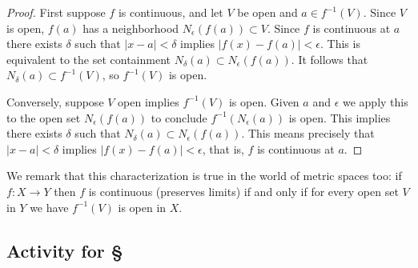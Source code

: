 \documentclass[11pt,oneside]{amsbook}
\theoremstyle{definition}
\theoremstyle{plain}
\theoremstyle{definition}
\theoremstyle{remark}
\numberwithin{equation}{section}
\numberwithin{figure}{section}
\begin{document}
\begin{proof}
  First suppose $f$ is continuous, and let $V$ be open and $a\in f^{-1}(V)$. Since $V$ is open, $f(a)$ has a neighborhood $N_\epsilon(f(a))\subset V$. Since $f$ is continuous at $a$ there exists $\delta$ such that $|x-a|<\delta$ implies $|f(x)-f(a)|<\epsilon$. This is equivalent to the set containment $N_\delta(a)\subset N_\epsilon(f(a))$. It follows that $N_\delta(a)\subset f^{-1}(V)$, so $f^{-1}(V)$ is open.
  
  Conversely, suppose $V$ open implies $f^{-1}(V)$ is open. Given $a$ and $\epsilon$ we apply this to the open set $N_\epsilon(f(a))$ to conclude $f^{-1}(N_\epsilon(a))$ is open. This implies there exists $\delta$ such that $N_\delta(a)\subset N_\epsilon(f(a))$. This means precisely that $|x-a|<\delta$ implies $|f(x)-f(a)|<\epsilon$, that is, $f$ is continuous at $a$.
\end{proof}

We remark that this characterization is true in the world of metric spaces too: if $f\colon X\to Y$ then $f$ is continuous (preserves limits) if and only if for every open set $V$ in $Y$ we have $f^{-1}(V)$ is open in $X$.


\newpage
\subsection*{Activity for \S \thesection}
\end{document}

